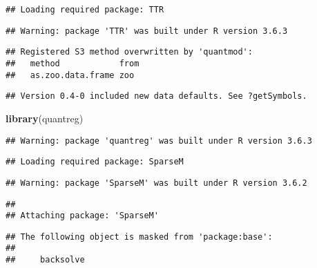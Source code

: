 \documentclass[
]{article}
\newenvironment{Shaded}{\begin{snugshade}}{\end{snugshade}}
\newcommand{\KeywordTok}[1]{\textcolor[rgb]{0.13,0.29,0.53}{\textbf{#1}}}
\newcommand{\NormalTok}[1]{#1}
\begin{document}
\begin{verbatim}
## Loading required package: TTR
\end{verbatim}

\begin{verbatim}
## Warning: package 'TTR' was built under R version 3.6.3
\end{verbatim}

\begin{verbatim}
## Registered S3 method overwritten by 'quantmod':
##   method            from
##   as.zoo.data.frame zoo
\end{verbatim}

\begin{verbatim}
## Version 0.4-0 included new data defaults. See ?getSymbols.
\end{verbatim}

\begin{Shaded}
\begin{Highlighting}[]
\KeywordTok{library}\NormalTok{(quantreg)}
\end{Highlighting}
\end{Shaded}

\begin{verbatim}
## Warning: package 'quantreg' was built under R version 3.6.3
\end{verbatim}

\begin{verbatim}
## Loading required package: SparseM
\end{verbatim}

\begin{verbatim}
## Warning: package 'SparseM' was built under R version 3.6.2
\end{verbatim}

\begin{verbatim}
## 
## Attaching package: 'SparseM'
\end{verbatim}

\begin{verbatim}
## The following object is masked from 'package:base':
## 
##     backsolve
\end{verbatim}
\end{document}
